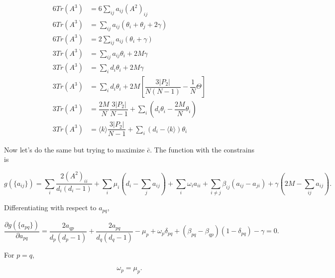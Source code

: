 \documentclass{article}
\begin{document}
\begin{align}
    6 Tr(A^3) &= 6 \sum_{ij} a_{ij} (A^2)_{ij} \nonumber \\
    6 Tr(A^3) &= \sum_{ij} a_{ij}(\theta_i + \theta_j + 2\gamma) \nonumber \\
    6 Tr(A^3) &= 2\sum_{ij} a_{ij}(\theta_i + \gamma) \nonumber \\
    3 Tr(A^3) &=  \sum_{i j} a_{ij}\theta_i + 2M\gamma \nonumber \\
    3 Tr(A^3) &=  \sum_{i} d_i\theta_i + 2M\gamma \nonumber \\
    3 Tr(A^3) &= \sum_{i} d_i\theta_i + 2 M \left[\dfrac{3 |P_2|}{N(N-1)} - \dfrac{1}{N} \Theta\right] \nonumber \\
    3 Tr(A^3) &= \dfrac{2 M}{N} \dfrac{3 |P_2|}{N-1} + \sum_{i} \left(d_i\theta_i  - \dfrac{2M}{N}  \theta_i\right) \nonumber \\
    3 Tr(A^3) &= \langle k \rangle \dfrac{3 |P_2|}{N-1} + \sum_{i} \left(d_i -\langle k \rangle\right) \theta_i
\end{align}



Now let's do the same but trying to maximize $\bar{c}$. The function with the constrains is 

\begin{equation}
    g(\lbrace a_{ij} \rbrace) = \sum_{i} \dfrac{2 (A^2)_{ii}}{d_i (d_i-1)} + \sum_i \mu_i \left(d_i - \sum_j a_{ij} \right) + \sum_i \omega_i a_{ii} + \sum_{i\neq j} \beta_{ij} (a_{ij}-a_{ji}) + \gamma \left(2M - \sum_{ij} a_{ij} \right).
\end{equation}

Differentiating with respect to $a_{pq}$,

\begin{equation}
    \dfrac{\partial g(\lbrace a_{pq} \rbrace)}{\partial a_{pq}} = \dfrac{2 a_{qp} }{d_p (d_p - 1)} + \dfrac{2 a_{pq}}{d_q (d_q - 1)} - \mu_p + \omega_p \delta_{pq} + (\beta_{pq} - \beta_{qp}) (1-\delta_{pq}) - \gamma = 0.
\end{equation}

For $p=q$,

\begin{equation}
    \omega_p = \mu_p.
\end{equation}
\end{document}
